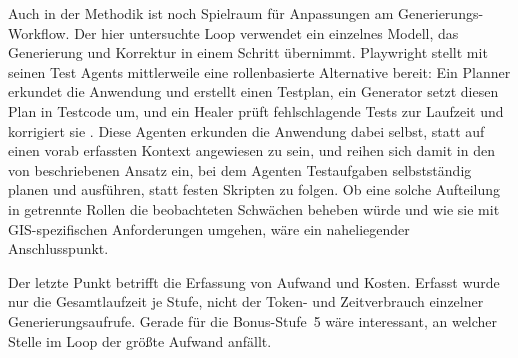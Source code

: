 Auch in der Methodik ist noch Spielraum für Anpassungen am Generierungs-Workflow. Der hier untersuchte Loop verwendet ein einzelnes Modell, das Generierung und Korrektur in einem Schritt übernimmt. Playwright stellt mit seinen Test Agents mittlerweile eine rollenbasierte Alternative bereit: Ein Planner erkundet die Anwendung und erstellt einen Testplan, ein Generator setzt diesen Plan in Testcode um, und ein Healer prüft fehlschlagende Tests zur Laufzeit und korrigiert sie \parencite[Playwright Test Agents]{microsoft_agents_nodate}. Diese Agenten erkunden die Anwendung dabei selbst, statt auf einen vorab erfassten Kontext angewiesen zu sein, und reihen sich damit in den von \textcite[S.~81]{kim_towards_2026} beschriebenen Ansatz ein, bei dem Agenten Testaufgaben selbstständig planen und ausführen, statt festen Skripten zu folgen. Ob eine solche Aufteilung in getrennte Rollen die beobachteten Schwächen beheben würde und wie sie mit GIS-spezifischen Anforderungen umgehen, wäre ein naheliegender Anschlusspunkt.

Der letzte Punkt betrifft die Erfassung von Aufwand und Kosten. Erfasst wurde nur die Gesamtlaufzeit je Stufe, nicht der Token- und Zeitverbrauch einzelner Generierungsaufrufe. Gerade für die Bonus-Stufe~5 wäre interessant, an welcher Stelle im Loop der größte Aufwand anfällt.
